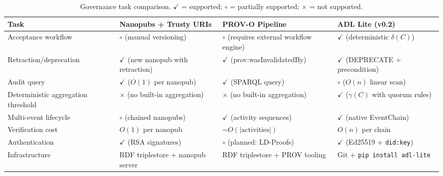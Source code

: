 \begin{table}[htbp]
\centering
\caption{Governance task comparison. $\checkmark$ = supported; $\circ$ = partially supported; $\times$ = not supported.}
\label{tab:comparative-eval-full}
\begin{tabular}{@{}p{3.0cm}p{3.5cm}p{3.5cm}p{3.5cm}@{}}
\toprule
\textbf{Task} & \textbf{Nanopubs + Trusty URIs} & \textbf{PROV-O Pipeline} & \textbf{ADL Lite (v0.2)} \\
\midrule
Acceptance workflow & $\circ$ (manual versioning) & $\circ$ (requires external workflow engine) & $\checkmark$ (deterministic $\delta(C)$) \\
Retraction/deprecation & $\checkmark$ (new nanopub with retraction) & $\checkmark$ (prov:wasInvalidatedBy) & $\checkmark$ (\textsc{DEPRECATE} + precondition) \\
Audit query & $\checkmark$ ($O(1)$ per nanopub) & $\checkmark$ (SPARQL query) & $\circ$ ($O(n)$ linear scan) \\
Deterministic aggregation threshold & $\times$ (no built-in aggregation) & $\times$ (no built-in aggregation) & $\checkmark$ ($\gamma(C)$ with quorum rules) \\
Multi-event lifecycle & $\circ$ (chained nanopubs) & $\checkmark$ (activity sequences) & $\checkmark$ (native EventChain) \\
Verification cost & $O(1)$ per nanopub & $\sim O(|\text{activities}|)$ & $O(n)$ per chain \\
Authentication & $\checkmark$ (RSA signatures) & $\circ$ (planned: LD-Proofs) & $\checkmark$ (Ed25519 + \texttt{did:key}) \\
Infrastructure & RDF triplestore + nanopub server & RDF triplestore + PROV tooling & Git + \texttt{pip install adl-lite} \\
\bottomrule
\end{tabular}
\end{table}

